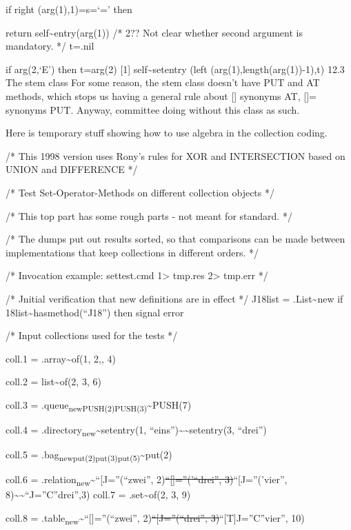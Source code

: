 if right (arg(1),1)=s=`=' then

return self\textasciitilde entry(arg(1)) /* 2?? Not clear whether second
argument is mandatory. */ t=.nil

if arg(2,`E') then t=arg(2) {[}1{]} self\textasciitilde setentry (left
(arg(1),length(arg(1))-1),t) 12.3 The stem class For some reason, the
stem class doesn't have PUT and AT methods, which stops us having a
general rule about {[}{]} synonyms AT, {[}{]}= synonyms PUT. Anyway,
committee doing without this class as such.

Here is temporary stuff showing how to use algebra in the collection
coding.

/* This 1998 version uses Rony's rules for XOR and INTERSECTION based on
UNION and DIFFERENCE */

/* Test Set-Operator-Methods on different collection objects */

/* This top part has some rough parts - not meant for standard. */

/* The dumps put out results sorted, so that comparisons can be made
between implementations that keep collections in different orders. */

/* Invocation example: settest.cmd 1\textgreater{} tmp.res
2\textgreater{} tmp.err */

/* Jnitial verification that new definitions are in effect */ J18list =
.List\textasciitilde new if \J18list\textasciitilde hasmethod(``J18'')
then signal error

/* Input collections used for the tests */

coll.1 = .array\textasciitilde of(1, 2,, 4)

coll.2 = list\textasciitilde of(2, 3, 6)

coll.3 = .queue\textsubscript{newPUSH(2)PUSH(3)}\textasciitilde PUSH(7)

coll.4 = .directory\textsubscript{new}\textasciitilde setentry(1,
``eins'')\textasciitilde\textasciitilde setentry(3, ``drei'')

coll.5 = .bag\textsubscript{newput(2)put(3)put(5)}\textasciitilde put(2)

coll.6 =
.relation\textsubscript{new}\textasciitilde{}``{[}J=''(``zwei'',
2)\st{``{[}{]}=''('``drei'', 3)}``{[}J=''('vier'',
8)\textasciitilde\textasciitilde{}``J=''C''drei'',3) coll.7 =
.set\textasciitilde of(2, 3, 9)

coll.8 = .table\textsubscript{new}\textasciitilde{}``{[}{]}=''(``zwei'',
2)\st{``{[}J=''(``drei'', 3)}``{[}T{]}J=''C''vier'', 10)

